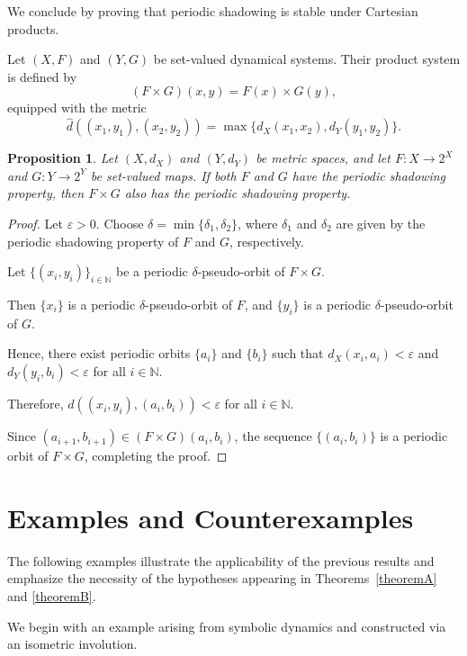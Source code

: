 \documentclass{amsart}
\newtheorem{proposition}[theorem]{Proposition}
\theoremstyle{definition}
\begin{document}
We conclude by proving that periodic shadowing is stable under Cartesian products.

Let $(X,F)$ and $(Y,G)$ be set-valued dynamical systems. Their product system is defined by 
\[
(F\times G)(x,y)
=
F(x)\times G(y),
\]
equipped with the metric
\[
\hat d((x_1,y_1),(x_2,y_2))
=
\max
\{
d_X(x_1,x_2),
d_Y(y_1,y_2)
\}.
\]

\begin{proposition}
\label{prop:product_psp}
Let $(X,d_X)$ and $(Y,d_Y)$ be metric spaces, and let $F:X\to 2^X$ and $G :Y\to 2^Y$ be set-valued maps. If both $F$ and $G$ have the periodic shadowing property, then $F\times G$ also has the periodic shadowing property.
\end{proposition}

\begin{proof}
Let $\varepsilon>0$. Choose $\delta=\min\{\delta_1,\delta_2\}$, where $\delta_1$ and $\delta_2$ are given by the periodic shadowing property of $F$ and $G$, respectively.

Let $\{(x_i,y_i)\}_{i\in\mathbb N}$ be a periodic $\delta$-pseudo-orbit of $F\times G$.

Then $\{x_i\}$ is a periodic $\delta$-pseudo-orbit of $F$, and $\{y_i\}$ is a periodic $\delta$-pseudo-orbit of $G$.

Hence, there exist periodic orbits $\{a_i\}$
and $\{b_i\}$ such that $d_X(x_i,a_i)<\varepsilon$ and $d_Y(y_i,b_i)<\varepsilon$ for all $i\in\mathbb N$.

Therefore, $\hat d((x_i,y_i),(a_i,b_i))
<
\varepsilon$ for all $i\in\mathbb N$. 

Since $
(a_{i+1},b_{i+1})\in (F\times G)(a_{i},b_{i})$, the sequence $\{(a_i,b_i)\}$ is a periodic orbit of $F\times G$, completing the proof.
\end{proof}


\section{Examples and Counterexamples}

The following examples illustrate the applicability of the previous
results and emphasize the necessity of the hypotheses appearing in
Theorems~\ref{theoremA} and \ref{theoremB}.

We begin with an example arising from symbolic dynamics and constructed via an isometric involution.
\end{document}
